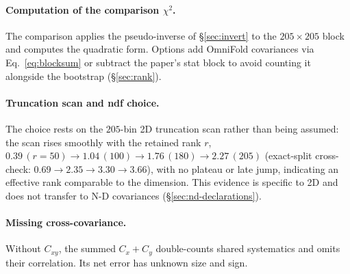 \paragraph{Computation of the comparison $\chi^{2}$.} The comparison applies the pseudo-inverse of \S\ref{sec:invert} to the $205\times205$ block and computes the quadratic form. Options add OmniFold covariances via Eq.~\eqref{eq:blocksum} or subtract the paper's stat block to avoid counting it alongside the bootstrap (\S\ref{sec:rank}).

\paragraph{Truncation scan and ndf choice.} The choice rests on the $205$-bin 2D truncation scan rather than being assumed: the scan rises smoothly with the retained rank $r$, $0.39\,(r{=}50)\to1.04\,(100)\to1.76\,(180)\to2.27\,(205)$ (exact-split cross-check: $0.69\to2.35\to3.30\to3.66$), with no plateau or late jump, indicating an effective rank comparable to the dimension. This evidence is specific to 2D and does not transfer to N-D covariances (\S\ref{sec:nd-declarations}).

\paragraph{Missing cross-covariance.} Without $C_{xy}$, the summed $C_{x}+C_{y}$ double-counts shared systematics and omits their correlation. Its net error has unknown size and sign.

